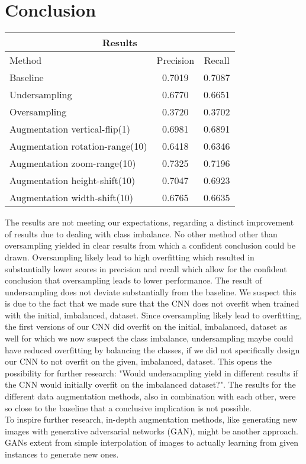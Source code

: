 \section* {Conclusion}

\begin{table}[h]
\centering
\begin{tabular}{ |p{4.5cm}|c|c|  }
 \hline
 \multicolumn{3}{|c|}{Results} \\
 \hline
 Method & Precision & Recall\\
 \hline
 Baseline & 0.7019 & 0.7087\\
 Undersampling & 0.6770 & 0.6651\\
 Oversampling & 0.3720 & 0.3702\\
 Augmentation vertical-flip(1) & 0.6981 & 0.6891\\
 Augmentation rotation-range(10) & 0.6418 & 0.6346\\
 Augmentation zoom-range(10) & 0.7325 & 0.7196\\
 Augmentation height-shift(10) & 0.7047 & 0.6923\\
 Augmentation width-shift(10) & 0.6765 & 0.6635\\
 \hline
\end{tabular}
\end{table}

The results are not meeting our expectations, regarding a distinct improvement of results due to dealing with class imbalance. No other method other than oversampling yielded in clear results from which a confident conclusion could be drawn. Oversampling likely lead to high overfitting which resulted in substantially lower scores in precision and recall which allow for the confident conclusion that oversampling leads to lower performance. The result of undersampling does not deviate substantially from the baseline. We suspect this is due to the fact that we made sure that the CNN does not overfit when trained with the initial, imbalanced, dataset. Since oversampling likely lead to overfitting, the first versions of our CNN did overfit on the initial, imbalanced, dataset as well for which we now suspect the class imbalance, undersampling maybe could have reduced overfitting by balancing the classes, if we did not specifically design our CNN to not overfit on the given, imbalanced, dataset. This opens the possibility for further research: "Would undersampling yield in different results if the CNN would initially overfit on the imbalanced dataset?". The results for the different data augmentation methods, also in combination with each other, were so close to the baseline that a conclusive implication is not possible. \\
To inspire further research, in-depth augmentation methods, like generating new images with generative adversarial networks (GAN), might be another approach. GANs extent from simple interpolation of images to actually learning from given instances to generate new ones.